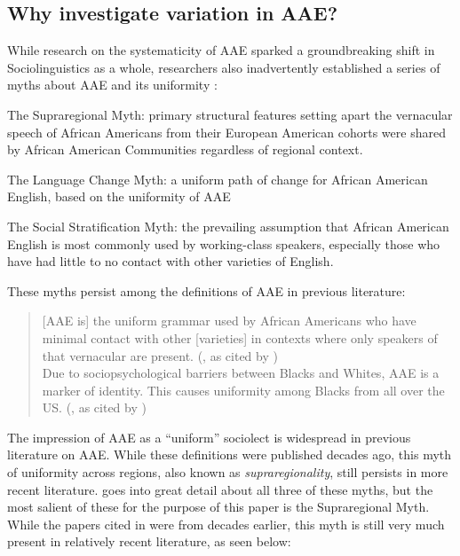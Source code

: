 \documentclass[output=paper,draftmode,colorlinks,citecolor=brown]{langscibook}
\begin{document}
\subsection{Why investigate variation in AAE?}  %
\label{sec:baxter:1.3}
While research on the systematicity of AAE sparked a groundbreaking shift in Sociolinguistics as a whole, researchers also inadvertently established a series of myths about AAE and its uniformity \citep{Wolfram2007}:


\ea The Supraregional Myth: primary structural features setting apart the vernacular speech of African Americans from their European American cohorts were shared by African American Communities regardless of regional context.
\z

\ea The Language Change Myth: a uniform path of change for African American English, based on the uniformity of AAE
\z

\ea The Social Stratification Myth: the prevailing assumption that African American English is most commonly used by working-class speakers, especially those who have had little to no contact with other varieties of English.
\citep[295--306]{Wolfram2007}
\z

\newpage
These myths persist among the definitions of AAE in previous literature:

\begin{quote}

[AAE is] the uniform grammar used by African Americans who have minimal contact with other [varieties] in contexts where only speakers of that vernacular are present. (\citealt{Baugh1983}, as cited by \citealt[6]{Labov1998})\\
Due to sociopsychological barriers between Blacks and Whites, AAE is a marker of identity. This causes uniformity among Blacks from all over the US. (\citealt{Rickford1999}, as cited by \citealt[20]{Johnson2008})
\end{quote}

The impression of AAE as a “uniform” sociolect is widespread in previous literature on AAE. While these definitions were published decades ago, this myth of uniformity across regions, also known as \textit{supraregionality}, still persists in more recent literature. \citet{Wolfram2007} goes into great detail about all three of these myths, but the most salient of these for the purpose of this paper is the Supraregional Myth. While the papers cited in \citet{Wolfram2007} were from decades earlier, this myth is still very much present in relatively recent literature, as seen below:
\end{document}
